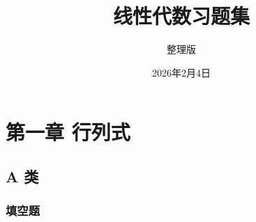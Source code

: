 \documentclass[12pt, a4paper]{ctexart}
\title{线性代数习题集}
\author{整理版}
\date{2026年2月4日}
\begin{document}
\maketitle
\tableofcontents
\newpage

\section{第一章 行列式}

\subsection{A 类}

\subsubsection*{填空题}
\end{document}

